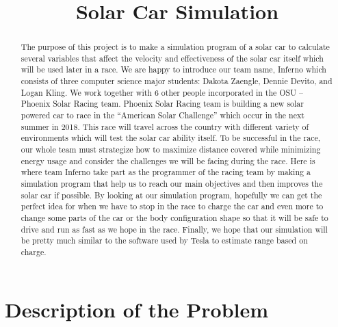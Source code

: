 \documentclass[journal, 10pt, draftclsnofoot, onecolumn]{IEEEtran}
\begin{document}
	\title{Solar Car Simulation}
	\author{
	}
\begin{titlepage}
\maketitle

\begin{abstract}
	The purpose of this project is to make a simulation program of a solar car to calculate several variables that affect the velocity and effectiveness of the solar car itself which will be used later in a race. We are happy to introduce our team name, Inferno which consists of three computer science major students: Dakota Zaengle, Dennie Devito, and Logan Kling. We work together with 6 other people incorporated in the OSU – Phoenix Solar Racing team. Phoenix Solar Racing team is building a new solar powered car to race in the “American Solar Challenge” which occur in the next summer in 2018. This race will travel across the country with different variety of environments which will test the solar car ability itself. To be successful in the race, our whole team must strategize how to maximize distance covered while minimizing energy usage and consider the challenges we will be facing during the race. Here is where team Inferno take part as the programmer of the racing team by making a simulation program that help us to reach our main objectives and then improves the solar car if possible. By looking at our simulation program, hopefully we can get the perfect idea for when we have to stop in the race to charge the car and even more to change some parts of the car or the body configuration shape so that it will be safe to drive and run as fast as we hope in the race. Finally, we hope that our simulation will be pretty much similar to the software used by Tesla to estimate range based on charge.   
\end{abstract}
\thispagestyle{empty}
\end{titlepage}

\section{Description of the Problem}
	
\end{document}
